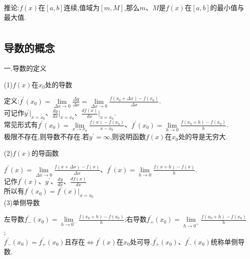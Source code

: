 \documentclass[utf8]{ctexart}
\begin{document}
推论:$f(x)$在$\left[a,b\right]$连续,值域为$\left[m,M\right]$,那么$m$、$M$是$f(x)$在$\left[a,b\right]$的最小值与最大值.


\newpage

\section{}

\subsection{\heiti 导数的概念}

一.导数的定义

(1)$f(x)$在$x_0$处的导数

定义:$\displaystyle f^{\prime}(x_0)=\lim \limits_{\Delta x \to 0}\frac{\Delta y}{\Delta x}=\lim \limits_{\Delta x \to 0}\frac{f(x_0+\Delta x)-f(x_0)}{\Delta x}$.
\\

可记作$\displaystyle y^\prime |_{x=x_0}$、$\displaystyle \frac{dy}{dx}|_{x=x_0} $、$\displaystyle \frac {df(x)}{dx}|_{x=x_0}$.
\\

常见形式有$\displaystyle f^{\prime}(x_0)=\lim \limits_{x \to x_0}\frac{f(x)-f(x_0)}{x-x_0}$、$\displaystyle f^{\prime}(x_0)=\lim \limits_{h \to 0}\frac{f(x_0+h)-f(x_0)}{h}$.
\\

极限不存在,则导数不存在.若$y^\prime =\infty$,则说明函数$f(x)$在$x_0$处的导是无穷大.

(2)$f(x)$的导函数

$\displaystyle f^{\prime}(x)=\lim \limits_{\Delta x \to 0}\frac{f(x+\Delta x)-f(x)}{\Delta x}$、$\displaystyle f^{\prime}(x)=\lim \limits_{h \to 0}\frac{f(x+h)-f(x)}{h}$.
\\

记作$f^{\prime}(x)$、$y^\prime$、$\displaystyle \frac{d y}{d x} $、$\displaystyle \frac{d f(x)}{d x} $
\\

所以有$f^{\prime}(x_0)=f^{\prime}(x)|_{x=x_0}$
\\

(3)单侧导数

左导数$\displaystyle f^{\prime}_{-}(x_0)=\lim \limits_{h \to 0^-}\frac{f(x_0+h)-f(x_0)}{h}$;右导数$\displaystyle f^{\prime}_{+}(x_0)=\lim \limits_{h \to 0^+}\frac{f(x_0+h)-f(x_0)}{h}$;
\\

$f^{\prime}_{-}(x_0)=f^{\prime}_{+}(x_0) \text{且存在} \Leftrightarrow f^{\prime}(x)$在$x_0$处可导.$f^{\prime}_{+}(x_0)$、$f^{\prime}_{-}(x_0)$统称单侧导数.
\end{document}
